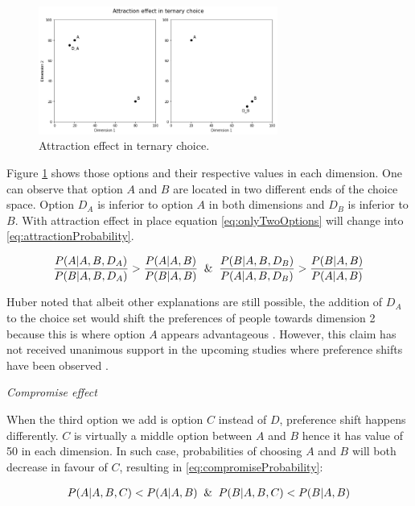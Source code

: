 \documentclass[a4paper,12pt]{article}
\begin{document}
\begin{figure}[h]
    \centering
    \includegraphics[width=0.7\textwidth]{staticFiles/attractionEffect.png}
    \caption{Attraction effect in ternary choice.} %
    \label{fig:attractionEffect} %

\end{figure}

Figure \ref{fig:attractionEffect} shows those options and their respective values in each dimension. One can observe that option $A$ and $B$ are located in two different ends of the choice space. Option $D_A$ is inferior to option $A$ in both dimensions and $D_B$ is inferior to $B$. With attraction effect in place equation  \ref{eq:onlyTwoOptions} will change into \ref{eq:attractionProbability}.

\begin{equation}\label{eq:attractionProbability}
    \frac{P(A|A,B,D_A)}{P(B|A,B,D_A)} > \frac{P(A|A,B)}{P(B|A,B)} \And \frac{P(B|A,B,D_B)}{P(A|A,B,D_B)} > \frac{P(B|A,B)}{P(A|A,B)}
\end{equation}

Huber noted that albeit other explanations are still possible, the addition of $D_A$ to the choice set would shift the preferences of people towards dimension 2 because this is where option $A$ appears advantageous \cite{huberEtAl82, bhatia2013associations}. However, this claim has not received unanimous support in the upcoming studies where preference shifts have been observed \citep{wedell1991distinguishing}.

\textit{Compromise effect}

When the third option we add is option $C$ instead of $D$, preference shift happens differently. $C$ is virtually a middle option between $A$ and $B$ hence it has value of 50 in each dimension. In such case, probabilities of choosing $A$ and $B$ will both decrease in favour of $C$, resulting in \ref{eq:compromiseProbability}:

\begin{align}\label{eq:compromiseProbability}
    P(A|A,B,C) < P(A|A,B) \And P(B|A,B,C) < P(B|A,B)
\end{align}
\end{document}
